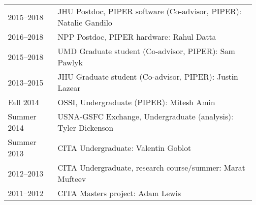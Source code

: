{\begin{tabular}{l p{12cm}}
2015--2018 & JHU Postdoc, PIPER software (Co-advisor, PIPER): Natalie Gandilo \\
2016--2018 & NPP Postdoc, PIPER hardware: Rahul Datta \\
2015--2018 & UMD Graduate student (Co-advisor, PIPER): Sam Pawlyk \\
2013--2015 & JHU Graduate student (Co-advisor, PIPER): Justin Lazear \\
Fall 2014 & OSSI, Undergraduate (PIPER): Mitesh Amin \\
Summer 2014 & USNA-GSFC Exchange, Undergraduate (analysis): Tyler Dickenson \\
Summer 2013 & CITA Undergraduate: Valentin Goblot \\
2012--2013 & CITA Undergraduate, research course/summer: Marat Mufteev \\
2011--2012 & CITA Masters project: Adam Lewis \\
\end{tabular} \\~\\~\\
}


